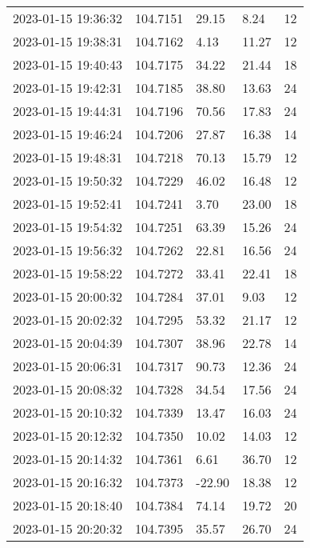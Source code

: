 \documentclass{nature_plusfigure}
\newcommand{\at}{AT2022tsd}
\begin{document}
\begin{supplement}
\begin{center}
\begin{longtable}{lllll}
2023-01-15 19:36:32 & 104.7151 & 29.15 & 8.24 & 12 \\ 
2023-01-15 19:38:31 & 104.7162 & 4.13 & 11.27 & 12 \\ 
2023-01-15 19:40:43 & 104.7175 & 34.22 & 21.44 & 18 \\ 
2023-01-15 19:42:31 & 104.7185 & 38.80 & 13.63 & 24 \\ 
2023-01-15 19:44:31 & 104.7196 & 70.56 & 17.83 & 24 \\ 
2023-01-15 19:46:24 & 104.7206 & 27.87 & 16.38 & 14 \\ 
2023-01-15 19:48:31 & 104.7218 & 70.13 & 15.79 & 12 \\ 
2023-01-15 19:50:32 & 104.7229 & 46.02 & 16.48 & 12 \\ 
2023-01-15 19:52:41 & 104.7241 & 3.70 & 23.00 & 18 \\ 
2023-01-15 19:54:32 & 104.7251 & 63.39 & 15.26 & 24 \\ 
2023-01-15 19:56:32 & 104.7262 & 22.81 & 16.56 & 24 \\ 
2023-01-15 19:58:22 & 104.7272 & 33.41 & 22.41 & 18 \\ 
2023-01-15 20:00:32 & 104.7284 & 37.01 & 9.03 & 12 \\ 
2023-01-15 20:02:32 & 104.7295 & 53.32 & 21.17 & 12 \\ 
2023-01-15 20:04:39 & 104.7307 & 38.96 & 22.78 & 14 \\ 
2023-01-15 20:06:31 & 104.7317 & 90.73 & 12.36 & 24 \\ 
2023-01-15 20:08:32 & 104.7328 & 34.54 & 17.56 & 24 \\ 
2023-01-15 20:10:32 & 104.7339 & 13.47 & 16.03 & 24 \\ 
2023-01-15 20:12:32 & 104.7350 & 10.02 & 14.03 & 12 \\ 
2023-01-15 20:14:32 & 104.7361 & 6.61 & 36.70 & 12 \\ 
2023-01-15 20:16:32 & 104.7373 & -22.90 & 18.38 & 12 \\ 
2023-01-15 20:18:40 & 104.7384 & 74.14 & 19.72 & 20 \\ 
2023-01-15 20:20:32 & 104.7395 & 35.57 & 26.70 & 24 \\ 
\hline 
\end{longtable} 
\end{center} 


%


\end{supplement}
\end{document}

